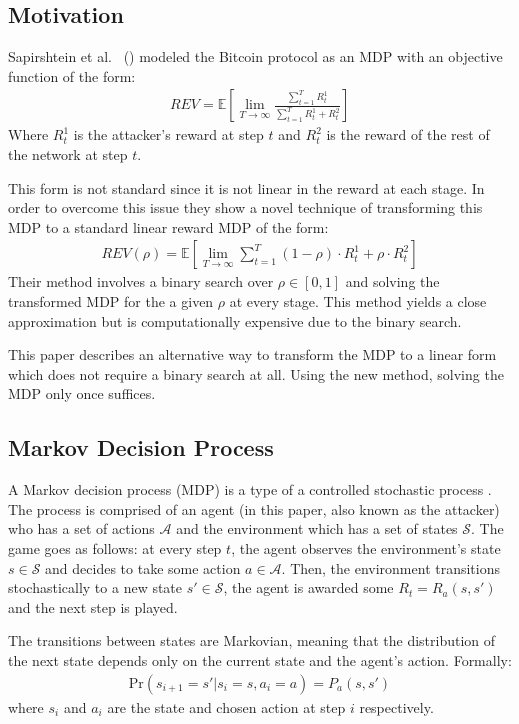\documentclass{article}
\renewcommand{\Pr}[1]{\text{Pr} \left( #1 \right)}
\newcommand{\E}[1]{\mathbb{E} \left[ #1 \right]}
\newcommand{\fancyS}{\mathcal{S}}
\newcommand{\fancyA}{\mathcal{A}}
\newcommand{\rev}{\textit{REV}}
\begin{document}
\subsection{Motivation}
Sapirshtein et al.~ (\cite{sapirshtein2016optimal}) modeled the Bitcoin protocol as an MDP with an objective function of the form:
\begin{gather*}
    \rev = \E{\lim\limits_{T\to\infty} \frac{\sum\limits_{t=1}^T R_t^1}{\sum\limits_{t=1}^T R_t^1 + R_t^2}}
\end{gather*}
Where $R_t^1$ is the attacker's reward at step $t$ and $R_t^2$ is the reward of the rest of the network at step $t$.

This form is not standard since it is not linear in the reward at each stage. In order to overcome this issue they show a novel technique of transforming this MDP to a standard linear reward MDP of the form:
\begin{gather*}
    \textit{REV}(\rho) = \E{\lim\limits_{T\to\infty} \sum\limits_{t=1}^T (1 - \rho) \cdot R_t^1 + \rho \cdot R_t^2}
\end{gather*}
Their method involves a binary search over $\rho \in [0,1]$ and solving the transformed MDP for the a given $\rho$ at every stage.
This method yields a close approximation but is computationally expensive due to the binary search.

This paper describes an alternative way to transform the MDP to a linear form which does not require a binary search at all. Using the new method, solving the MDP only once suffices.

\subsection{Markov Decision Process}\label{MDP_explain}
A Markov decision process (MDP) is a type of a controlled stochastic process \cite{bertsekas1995dynamic}. The process is comprised of an agent (in this paper, also known as the attacker) who has a set of actions $\fancyA$ and the environment which has a set of states $\fancyS$.
The game goes as follows: at every step $t$, the agent observes the environment's state $s \in \fancyS$ and decides to take some action $a \in \fancyA$. Then, the environment transitions stochastically to a new state $s' \in \fancyS$, the agent is awarded some $R_t = R_a(s, s')$ and the next step is played.

The transitions between states are Markovian, meaning that the distribution of the next state depends only on the current state and the agent's action. Formally:
\begin{gather*}
   \Pr{s_{i+1} = s' | s_i = s, a_i = a} =  P_a(s, s')
\end{gather*}
where $s_i$ and $a_i$ are the state and chosen action at step $i$ respectively.
\end{document}
